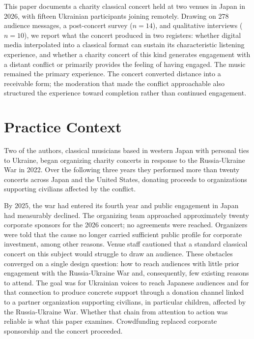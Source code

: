 \documentclass[sigconf,anonymous,review]{acmart}
\begin{document}
This paper documents a charity classical concert held at two venues in Japan in 2026, with
fifteen Ukrainian participants joining remotely.
Drawing on 278 audience messages, a post-concert survey ($n=14$), and qualitative interviews
($n=10$), we report what the concert produced in two registers: whether digital media
interpolated into a classical format can sustain its characteristic listening experience, and
whether a charity concert of this kind generates engagement with a distant conflict or
primarily provides the feeling of having engaged.
The music remained the primary experience. The concert converted distance into a receivable
form; the moderation that made the conflict approachable also structured the experience
toward completion rather than continued engagement.

\section{Practice Context}

Two of the authors, classical musicians based in western Japan with personal ties to Ukraine,
began organizing charity concerts in response to the Russia-Ukraine War in 2022.
Over the following three years they performed more than twenty concerts across Japan and
the United States, donating proceeds to organizations supporting civilians affected by the
conflict.

By 2025, the war had entered its fourth year and public engagement in Japan had measurably
declined.
The organizing team approached approximately twenty corporate sponsors for the 2026 concert;
no agreements were reached.
Organizers were told that the cause no longer carried sufficient public profile for corporate
investment, among other reasons.
Venue staff cautioned that a standard classical concert on this subject would struggle to
draw an audience.
These obstacles converged on a single design question: how to reach audiences with little
prior engagement with the Russia-Ukraine War and, consequently, few existing reasons to attend.
The goal was for Ukrainian voices to reach Japanese audiences and for that connection to
produce concrete support through a donation channel linked to a partner organization
supporting civilians, in particular children, affected by the Russia-Ukraine War.
Whether that chain from attention to action was reliable is what this paper examines.
Crowdfunding replaced corporate sponsorship and the concert proceeded.

\end{document}
